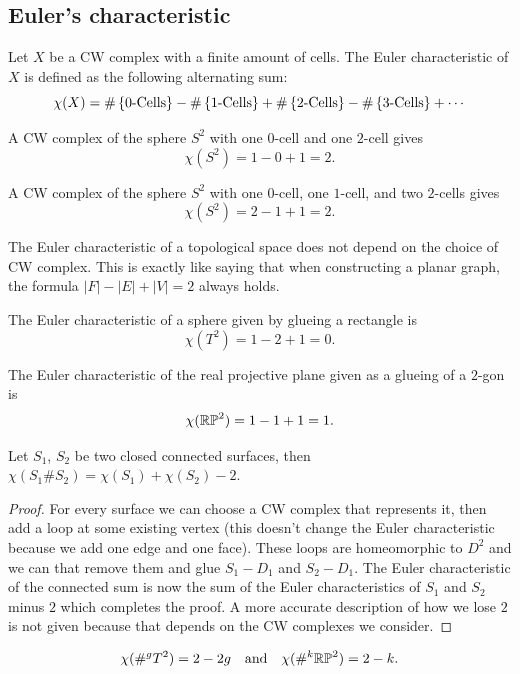 \documentclass[11pt,a4paper]{article}
\begin{document}
\subsection{Euler's characteristic}
\begin{definition}
  Let $X$ be a CW complex with a finite amount of cells.
  The Euler characteristic of $X$ is defined as the following alternating
  sum:
  \[
    \chi(X)=
    \#\left\{0\text-\text{Cells}\right\} -
    \#\left\{1\text-\text{Cells}\right\} +
    \#\left\{2\text-\text{Cells}\right\} -
    \#\left\{3\text-\text{Cells}\right\} + \cdots
  \]
\end{definition}
\begin{example}
  A CW complex of the sphere $S^2$ with one $0$-cell and one $2$-cell gives
  \[
    \chi(S^2) = 1 - 0 + 1 = 2.
  \]
\end{example}
\begin{example}
  A CW complex of the sphere $S^2$ with one $0$-cell, one $1$-cell,
  and two $2$-cells gives
  \[
    \chi(S^2) = 2 - 1 + 1 = 2.
  \]
\end{example}
\begin{remark}
  The Euler characteristic of a topological space does not depend on the
  choice of CW complex.
  This is exactly like saying that when constructing a planar graph, the
  formula $|F| - |E| + |V| = 2$ always holds.
\end{remark}
\begin{example}
  The Euler characteristic of a sphere given by glueing a rectangle is
  \[
    \chi(T^2) = 1 - 2 + 1 = 0.
  \]
\end{example}
\begin{example}
  The Euler characteristic of the real projective plane given as a glueing of 
  a $2$-gon is
  \[
    \chi(\mathbb{RP}^2) = 1 - 1 + 1 = 1.
  \]
\end{example}

\begin{proposition}
  Let $S_1$, $S_2$ be two closed connected surfaces, then
  $\chi(S_1 \# S_2) = \chi(S_1) + \chi(S_2) - 2$.
\end{proposition}
\begin{proof}
  For every surface we can choose a CW complex that represents it,
  then add a loop at some existing vertex (this doesn't change the
  Euler characteristic because we add one edge and one face).
  These loops are homeomorphic to $D^2$ and we can that remove them
  and glue $S_1 - D_1$ and $S_2 - D_1$.
  The Euler characteristic of the connected sum is now the sum of the Euler
  characteristics of $S_1$ and $S_2$ minus $2$ which completes the proof.
  A more accurate description of how we lose $2$ is not given because
  that depends on the CW complexes we consider.
\end{proof}
\begin{corollary}
  \[
    \chi(\#^g T^2) = 2 - 2g \quad \text{and} \quad
    \chi(\#^k \mathbb{RP}^2) = 2 - k.
  \]
\end{corollary}
\end{document}
